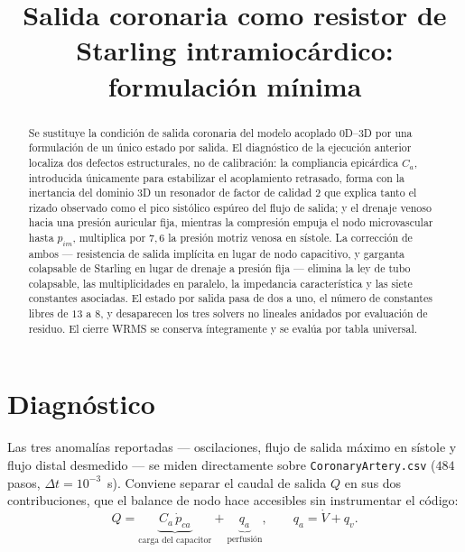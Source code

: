 \documentclass[11pt]{article}
\title{Salida coronaria como resistor de Starling intramioc\'ardico:\\
       formulaci\'on m\'inima}
\date{}
\begin{document}
\maketitle

\begin{abstract}
\noindent
Se sustituye la condici\'on de salida coronaria del modelo acoplado 0D--3D por
una formulaci\'on de un \'unico estado por salida. El diagn\'ostico de la
ejecuci\'on anterior localiza dos defectos estructurales, no de calibraci\'on:
la compliancia epic\'ardica $C_a$, introducida \'unicamente para estabilizar el
acoplamiento retrasado, forma con la inertancia del dominio 3D un resonador de
factor de calidad $2$ que explica tanto el rizado observado como el pico
sist\'olico esp\'ureo del flujo de salida; y el drenaje venoso hacia una
presi\'on auricular fija, mientras la compresi\'on empuja el nodo microvascular
hasta $p_{im}$, multiplica por $7{,}6$ la presi\'on motriz venosa en s\'istole.
La correcci\'on de ambos --- resistencia de salida impl\'icita en lugar de nodo
capacitivo, y garganta colapsable de Starling en lugar de drenaje a presi\'on
fija --- elimina la ley de tubo colapsable, las multiplicidades en paralelo, la
impedancia caracter\'istica y las siete constantes asociadas. El estado por
salida pasa de dos a uno, el n\'umero de constantes libres de $13$ a $8$, y
desaparecen los tres solvers no lineales anidados por evaluaci\'on de residuo.
El cierre WRMS se conserva \'integramente y se eval\'ua por tabla universal.
\end{abstract}

\section{Diagn\'ostico}
\label{sec:diag}

Las tres anomal\'ias reportadas --- oscilaciones, flujo de salida m\'aximo en
s\'istole y flujo distal desmedido --- se miden directamente sobre
\texttt{CoronaryArtery.csv} ($484$ pasos, $\Delta t=10^{-3}$~s). Conviene
separar el caudal de salida $Q$ en sus dos contribuciones, que el balance de
nodo hace accesibles sin instrumentar el c\'odigo:
\begin{equation}
  Q=\underbrace{C_a\,\dot p_{ca}}_{\text{carga del capacitor}}
   +\underbrace{q_a}_{\text{perfusi\'on}},
  \qquad
  q_a=\dot V+q_v .
  \label{eq:split}
\end{equation}
\end{document}

